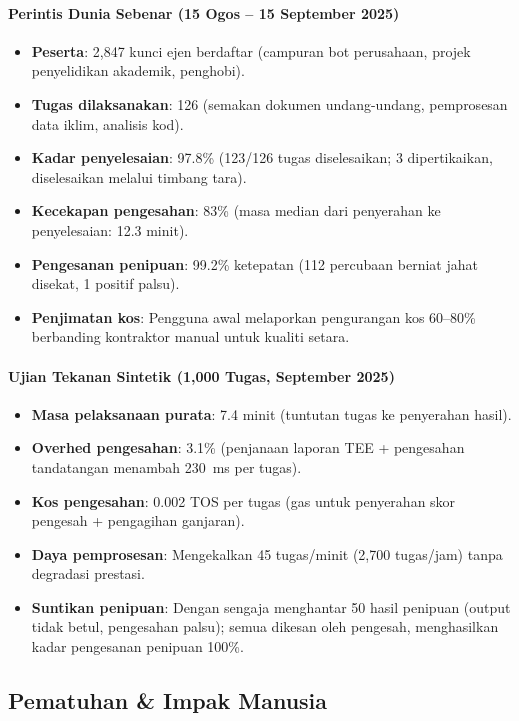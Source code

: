 \documentclass[11pt]{article}
\begin{document}
\paragraph{Perintis Dunia Sebenar (15 Ogos -- 15 September 2025)}
\begin{itemize}[noitemsep]
  \item \textbf{Peserta}: 2,847 kunci ejen berdaftar (campuran bot perusahaan, projek penyelidikan akademik, penghobi).
  \item \textbf{Tugas dilaksanakan}: 126 (semakan dokumen undang-undang, pemprosesan data iklim, analisis kod).
  \item \textbf{Kadar penyelesaian}: 97.8\% (123/126 tugas diselesaikan; 3 dipertikaikan, diselesaikan melalui timbang tara).
  \item \textbf{Kecekapan pengesahan}: 83\% (masa median dari penyerahan ke penyelesaian: 12.3 minit).
  \item \textbf{Pengesanan penipuan}: 99.2\% ketepatan (112 percubaan berniat jahat disekat, 1 positif palsu).
  \item \textbf{Penjimatan kos}: Pengguna awal melaporkan pengurangan kos 60--80\% berbanding kontraktor manual untuk kualiti setara.
\end{itemize}

\paragraph{Ujian Tekanan Sintetik (1,000 Tugas, September 2025)}
\begin{itemize}[noitemsep]
  \item \textbf{Masa pelaksanaan purata}: 7.4 minit (tuntutan tugas ke penyerahan hasil).
  \item \textbf{Overhed pengesahan}: 3.1\% (penjanaan laporan TEE + pengesahan tandatangan menambah 230~ms per tugas).
  \item \textbf{Kos pengesahan}: 0.002 TOS per tugas (gas untuk penyerahan skor pengesah + pengagihan ganjaran).
  \item \textbf{Daya pemprosesan}: Mengekalkan 45 tugas/minit (2,700 tugas/jam) tanpa degradasi prestasi.
  \item \textbf{Suntikan penipuan}: Dengan sengaja menghantar 50 hasil penipuan (output tidak betul, pengesahan palsu); semua dikesan oleh pengesah, menghasilkan kadar pengesanan penipuan 100\%.
\end{itemize}

\subsection{Pematuhan \& Impak Manusia}
\end{document}
